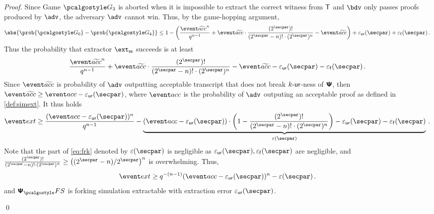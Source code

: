 \documentclass[runningheads,11pt]{llncs}
\begin{document}
\begin{proof}
{ Since Game $\game{3}$ is aborted when it is impossible to extract the correct witness from
 $\mathsf{T}$ and $\bdv$ only passes proofs produced by $\adv$, the adversary $\advse$ cannot
 win. Thus, by the game-hopping argument,
\[
	\abs{\prob{\game{0}} - \prob{\game{4}}} \leq 1 -
  \left(\frac{\waccProb^{n}}{q^{n - 1}} + \waccProb \cdot \frac{(2^\secpar)
      !}{(2^\secpar - n)! \cdot (2^\secpar)^{n}} - \waccProb\right) + \epsur(\secpar) +
  \epsss(\secpar)\,.
\]
Thus the probability that extractor $\extss$ succeeds is at least
\[
	\frac{\waccProb^{n}}{q^{n - 1}} + \waccProb \cdot \frac{(2^\secpar)
    !}{(2^\secpar - n)! \cdot (2^\secpar)^{n}} - \waccProb - \epsur(\secpar) 
  - \epsss(\secpar)\,.
\]
Since $\waccProb$ is probability of $\advse$ outputting acceptable transcript
that does not break ${k\text{-}\mathsf{ur}}$-ness of $\bm{\mathsf{\Psi}}$, then $\waccProb \geq \accProb -
\epsur(\secpar)$, where $\accProb$ is the probability of $\advse$ outputing an acceptable
proof as defined in \cref{def:simext}. It thus holds
\begin{equation}
	\label{eq:frk}
	\extProb \geq \frac{(\accProb - \epsur(\secpar))^{n}}{q^{n - 1}} -
  \underbrace{(\accProb - \epsur(\secpar)) \cdot \left( 1 - \frac{(2^\secpar)
        !}{(2^\secpar - n)! \cdot (2^\secpar)^{n}}\right) - \epsur(\secpar) -
    \epsss(\secpar)}_{\eps(\secpar)}\,.
\end{equation}
Note that the part of \cref{eq:frk} denoted by $\eps(\secpar)$ is negligible as
$\epsur(\secpar), \epsss(\secpar)$ are negligible, and
$\frac{(2^\secpar) !}{(2^\secpar - n)! \cdot (2^\secpar)^{n}} \geq
\left(\infrac{(2^\secpar - n)}{2^\secpar}\right)^{n}$ is overwhelming.  Thus,
\[
	\extProb \geq q^{-(n - 1)} (\accProb - \epsur(\secpar))^{n} -\eps(\secpar)\,.
\] 
and $\psfs$ is forking simulation extractable with extraction error $\epsur(\secpar)$.

}
\qed
\end{proof}
\end{document}
